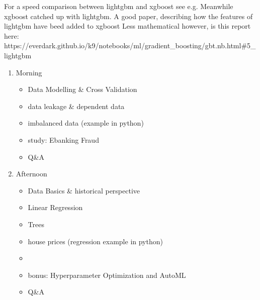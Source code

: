 \documentclass[letterpaper,10pt,english]{jupyterBook}
\begin{document}
\sphinxAtStartPar
For a speed comparison between lightgbm and xgboost see e.g.  Meanwhile xgboost catched up with lightgbm.
A good paper, describing how the features of lightgbm have beed added to xgboost 
Less mathematical however, is this report here:
https://everdark.github.io/k9/notebooks/ml/gradient\_boosting/gbt.nb.html\#5\_lightgbm
\begin{enumerate}
%
\item {} 
\sphinxAtStartPar
Morning
\begin{itemize}
\item {} 
\sphinxAtStartPar
Data Modelling \& Cross Validation

\item {} 
\sphinxAtStartPar
data leakage \& dependent data

\item {} 
\sphinxAtStartPar
imbalanced data (example in python)

\item {} 
\sphinxAtStartPar
study: Ebanking Fraud

\item {} 
\sphinxAtStartPar
Q\&A

\end{itemize}



\item {} 
\sphinxAtStartPar
Afternoon
\begin{itemize}
\item {} 
\sphinxAtStartPar
Data Basics \& historical perspective

\item {} 
\sphinxAtStartPar
Linear Regression

\item {} 
\sphinxAtStartPar
Trees

\item {} 
\sphinxAtStartPar
house prices (regression example in python)

\item {} 
\sphinxAtStartPar
{}

\item {} 
\sphinxAtStartPar
bonus: Hyperparameter Optimization and AutoML

\item {} 
\sphinxAtStartPar
Q\&A

\end{itemize}

\end{enumerate}
\end{document}
